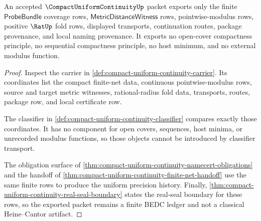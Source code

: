 \begin{theorem}
\label{thm:compact-uniform-continuity-non-escape-ledger}
An accepted $\CompactUniformContinuityUp$ packet exports only the finite $\mathsf{ProbeBundle}$ coverage rows, $\mathsf{MetricDistanceWitness}$ rows, pointwise-modulus rows, positive $\RatUp$ fold rows, displayed transports, continuation routes, package provenance, and local naming provenance. It exports no open-cover compactness principle, no sequential compactness principle, no host minimum, and no external modulus function.
\end{theorem}
\begin{proof}
Inspect the carrier in \autoref{def:compact-uniform-continuity-carrier}. Its coordinates list the compact finite-net data, continuous pointwise-modulus rows, source and target metric witnesses, rational-radius fold data, transports, routes, package row, and local certificate row.

The classifier in \autoref{def:compact-uniform-continuity-classifier} compares exactly those coordinates. It has no component for open covers, sequences, host minima, or unrecorded modulus functions, so those objects cannot be introduced by classifier transport.

The obligation surface of \autoref{thm:compact-uniform-continuity-namecert-obligations} and the handoff of \autoref{thm:compact-uniform-continuity-finite-net-handoff} use the same finite rows to produce the uniform precision history. Finally, \autoref{thm:compact-uniform-continuity-real-seal-boundary} states the real-seal boundary for these rows, so the exported packet remains a finite BEDC ledger and not a classical Heine--Cantor artifact.
\end{proof}

